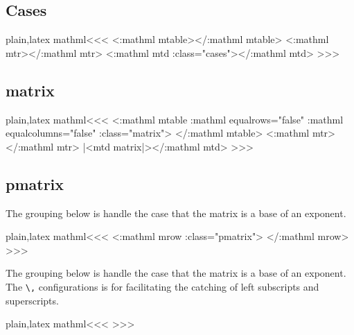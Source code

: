 {{{{{{%
\subsection{Cases}

\<plain,latex mathml\><<<
    {}{} {\Tg<\a:mathml mtable>}{\Tg</\a:mathml mtable>}
    {\Tg<\a:mathml mtr>}{\Tg</\a:mathml mtr>}
    {\Tg<\a:mathml mtd \mml:class="cases">}{\Tg</\a:mathml mtd>}
>>>


\subsection{matrix}

\<plain,latex mathml\><<<
   {\Tg<\a:mathml mtable 
        \a:mathml equalrows="false" \a:mathml equalcolumns="false"\Hnewline
          \mml:class="matrix">} 
   {\Tg</\a:mathml mtable>}
   {\Tg<\a:mathml mtr>}{\Tg</\a:mathml mtr>}
   {|<mtd matrix|>}{\Tg</\a:mathml mtd>}
>>>



\subsection{pmatrix}


The grouping below is handle the case that the matrix is a base of an exponent.


\<plain,latex mathml\><<<
  {\bgroup\Tg<\a:mathml mrow\Hnewline
   \mml:class="pmatrix">}  {\Tg</\a:mathml mrow>\egroup}
>>>



The grouping below is handle the case that the matrix is a base of an
exponent. The \verb|\,| configurations is for facilitating the
catching of  left subscripts and superscripts.


\<plain,latex mathml\><<<
\Configure{,}
   {{}}
\Configure{:}
   {{}}
\Configure{;}
   {{}}
\Configure{>}
   {{}}
\Configure{!}
   {{}}
>>>


}}}}}}
